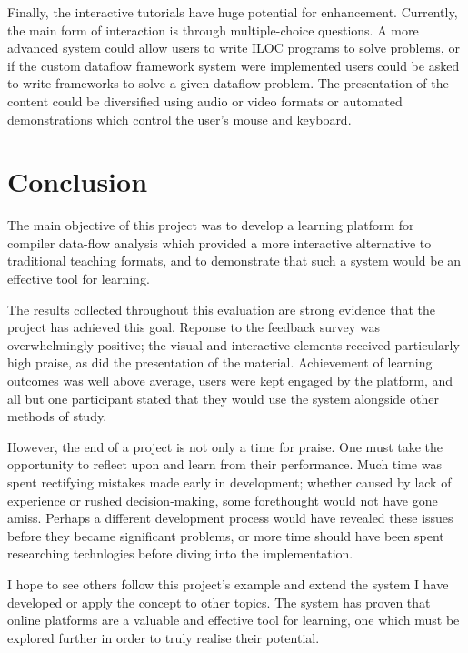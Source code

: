 \documentclass[bsc,twoside,singlespacing,parskip,logo,notimes,normalheadings]{infthesis}
\begin{document}
    Finally, the interactive tutorials have huge potential for
    enhancement. Currently, the main form of interaction is through
    multiple-choice questions. A more advanced system could allow
    users to write ILOC programs to solve problems, or if the custom
    \gls{dataflow} framework system were implemented users could be
    asked to write frameworks to solve a given \gls{dataflow}
    problem. The presentation of the content could be diversified
    using audio or video formats or automated demonstrations which
    control the user's mouse and keyboard.

    \section{Conclusion}
    The main objective of this project was to develop a learning
    platform for compiler data-flow analysis which provided a more
    interactive alternative to traditional teaching formats, and to
    demonstrate that such a system would be an effective tool for
    learning.

    The results collected throughout this evaluation are strong
    evidence that the project has achieved this goal. Reponse to the
    feedback survey was overwhelmingly positive; the visual and
    interactive elements received particularly high praise, as did the
    presentation of the material. Achievement of learning outcomes was
    well above average, users were kept engaged by the platform, and
    all but one participant stated that they would use the system
    alongside other methods of study.

    However, the end of a project is not only a time for praise. One
    must take the opportunity to reflect upon and learn from their
    performance. Much time was spent rectifying mistakes made early in
    development; whether caused by lack of experience or rushed
    decision-making, some forethought would not have gone
    amiss. Perhaps a different development process would have revealed
    these issues before they became significant problems, or more time
    should have been spent researching technlogies before diving into
    the implementation.    

    I hope to see others follow this project's example and extend the
    system I have developed or apply the concept to other topics. The
    system has proven that online platforms are a valuable and
    effective tool for learning, one which must be explored further in
    order to truly realise their potential.
\end{document}
